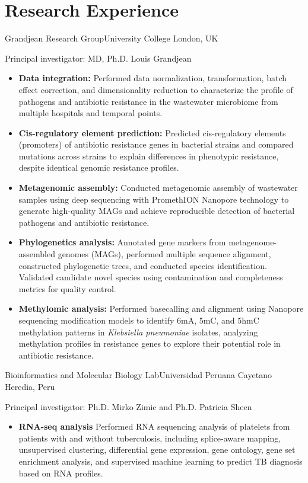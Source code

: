 \documentclass[11pt,a4paper,sans]{moderncv}
\begin{document}
\section{Research Experience}
  {Grandjean Research Group}{University College London, UK}{}
  {Principal investigator: MD, Ph.D. Louis Grandjean
  \begin{itemize}%
    \item \textbf{Data integration:} {\footnotesize Performed data normalization, transformation, batch effect correction, and dimensionality reduction to characterize the profile of pathogens and antibiotic resistance in the wastewater microbiome from multiple hospitals and temporal points.}
    \item \textbf{Cis-regulatory element prediction:} {\footnotesize Predicted cis-regulatory elements (promoters) of antibiotic resistance genes in bacterial strains and compared mutations across strains to explain differences in phenotypic resistance, despite identical genomic resistance profiles.}
    \item \textbf{Metagenomic assembly:} {\footnotesize Conducted metagenomic assembly of wastewater samples using deep sequencing with PromethION Nanopore technology to generate high-quality MAGs and achieve reproducible detection of bacterial pathogens and antibiotic resistance.}
    \item \textbf{Phylogenetics analysis:} {\footnotesize Annotated gene markers from metagenome-assembled genomes (MAGs), performed multiple sequence alignment, constructed phylogenetic trees, and conducted species identification. Validated candidate novel species using contamination and completeness metrics for quality control.}
    \item \textbf{Methylomic analysis:} {\footnotesize Performed basecalling and alignment using Nanopore sequencing modification models to identify 6mA, 5mC, and 5hmC methylation patterns in \textit{Klebsiella pneumoniae} isolates, analyzing methylation profiles in resistance genes to explore their potential role in antibiotic resistance.}
  \end{itemize}
  }

  {Bioinformatics and Molecular Biology Lab}{Universidad Peruana Cayetano Heredia, Peru}
  {}
  {Principal investigator: Ph.D. Mirko Zimic and  Ph.D. Patricia Sheen%
  \begin{itemize}%
    \item \textbf{RNA-seq analysis} Performed RNA sequencing analysis of platelets from patients with and without tuberculosis, including splice-aware mapping, unsupervised clustering, differential gene expression, gene ontology, gene set enrichment analysis, and supervised machine learning to predict TB diagnosis based on RNA profiles.
  \end{itemize}
  }
\end{document}
